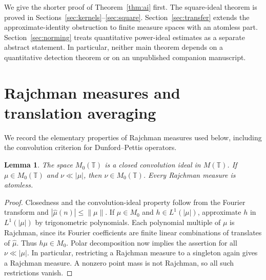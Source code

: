 \documentclass[11pt,reqno]{amsart}
\newtheorem{lemma}[theorem]{Lemma}
\theoremstyle{definition}
\theoremstyle{remark}
\newcommand{\T}{\mathbb T}
\begin{document}
We give the shorter proof of Theorem~\ref{thm:ai} first. The square-ideal theorem is proved in Sections~\ref{sec:kernels}--\ref{sec:square}. Section~\ref{sec:transfer} extends the approximate-identity obstruction to finite measure spaces with an atomless part. Section~\ref{sec:norming} treats quantitative power-ideal estimates as a separate abstract statement. In particular, neither main theorem depends on a quantitative detection theorem or on an unpublished companion manuscript.

\section{Rajchman measures and translation averaging}\label{sec:averaging}

We record the elementary properties of Rajchman measures used below, including the convolution criterion for Dunford--Pettis operators.

\begin{lemma}\label{lem:rajchman}
The space $M_0(\T)$ is a closed convolution ideal in $M(\T)$. If $\mu\in M_0(\T)$ and $\nu\ll|\mu|$, then $\nu\in M_0(\T)$. Every Rajchman measure is atomless.
\end{lemma}
\begin{proof}
Closedness and the convolution-ideal property follow from the Fourier transform and $|\widehat\mu(n)|\leq\|\mu\|$. If $\mu\in M_0$ and $h\in L^1(|\mu|)$, approximate $h$ in $L^1(|\mu|)$ by trigonometric polynomials. Each polynomial multiple of $\mu$ is Rajchman, since its Fourier coefficients are finite linear combinations of translates of $\widehat\mu$. Thus $h\mu\in M_0$. Polar decomposition now implies the assertion for all $\nu\ll|\mu|$. In particular, restricting a Rajchman measure to a singleton again gives a Rajchman measure. A nonzero point mass is not Rajchman, so all such restrictions vanish.
\end{proof}
\end{document}
